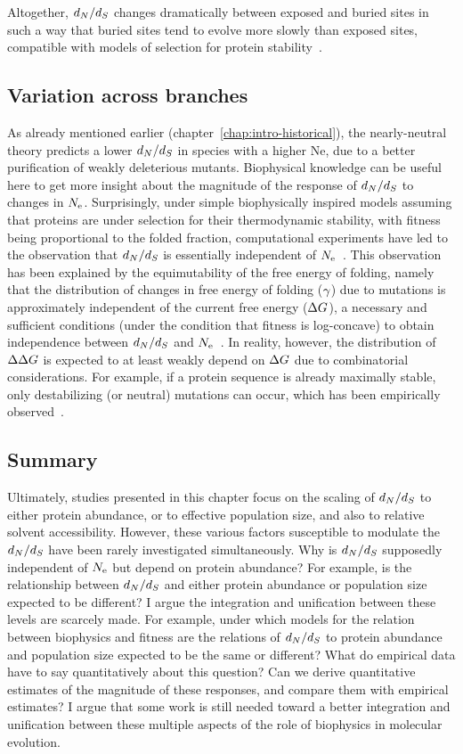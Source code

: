 Altogether, $d_N / d_S$ changes dramatically between exposed and buried sites in such a way that buried sites tend to evolve more slowly than exposed sites, compatible with models of selection for protein stability~\citep{Echave2016}.

\subsection{Variation across branches}
\label{subsec:thermo-variation-across-branches}

As already mentioned earlier (chapter~\ref{chap:intro-historical}), the nearly-neutral theory predicts a lower $d_N / d_S$ in species with a higher Ne, due to a better purification of weakly deleterious mutants.
Biophysical knowledge can be useful here to get more insight about the magnitude of the response of $d_N / d_S$ to changes in $N_{\textrm{e}}$.
Surprisingly, under simple biophysically inspired models assuming that proteins are under selection for their thermodynamic stability, with fitness being proportional to the folded fraction, computational experiments have led to the observation that $d_N / d_S$ is essentially independent of $N_{\textrm{e}}$~\citep{Goldstein2013}.
This observation has been explained by the equimutability of the free energy of folding, namely that the distribution of changes in free energy of folding ($\gamma$) due to mutations is approximately independent of the current free energy ($\Delta G$), a necessary and sufficient conditions (under the condition that fitness is log-concave) to obtain independence between $d_N / d_S$ and $N_{\textrm{e}}$~\citep{Cherry1998}.
In reality, however, the distribution of $\Delta \Delta G$ is expected to at least weakly depend on $\Delta G$ due to combinatorial considerations.
For example, if a protein sequence is already maximally stable, only destabilizing (or neutral) mutations can occur, which has been empirically observed~\citep{Serohijos2012}.

\subsection{Summary}

Ultimately, studies presented in this chapter focus on the scaling of $d_N / d_S$ to either protein abundance, or to effective population size, and also to relative solvent accessibility.
However, these various factors susceptible to modulate the $d_N / d_S$ have been rarely investigated simultaneously.
Why is $d_N / d_S$ supposedly independent of $N_{\textrm{e}}$ but depend on protein abundance?
For example, is the relationship between $d_N / d_S$ and either protein abundance or population size expected to be different?
I argue the integration and unification between these levels are scarcely made.
For example, under which models for the relation between biophysics and fitness are the relations of $d_N / d_S$ to protein abundance and population size expected to be the same or different?
What do empirical data have to say quantitatively about this question?
Can we derive quantitative estimates of the magnitude of these responses, and compare them with empirical estimates?
I argue that some work is still needed toward a better integration and unification between these multiple aspects of the role of biophysics in molecular evolution.

